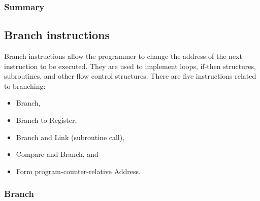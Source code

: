 \subsubsection{Summary}

\newpage
\subsection{Branch instructions}
Branch instructions allow the programmer to change the address of the next instruction to be
executed. They are used to implement loops, if-then structures, subroutines, and other flow
control structures. There are five instructions related to branching:
\begin{itemize}
	\item Branch,
	\item Branch to Register,
	\item Branch and Link (subroutine call),
	\item Compare and Branch, and
	\item Form program-counter-relative Address.
\end{itemize}

\subsubsection{Branch}